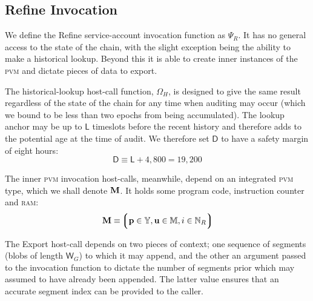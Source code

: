 \subsection{Refine Invocation}\label{sec:refineinvocation}

We define the Refine service-account invocation function as $\Psi_R$. It has no general access to the state of the \Jam chain, with the slight exception being the ability to make a historical lookup. Beyond this it is able to create inner instances of the \textsc{pvm} and dictate pieces of data to export.

The historical-lookup host-call function, $\Omega_H$, is designed to give the same result regardless of the state of the chain for any time when auditing may occur (which we bound to be less than two epochs from being accumulated). The lookup anchor may be up to $\mathsf{L}$ timeslots before the recent history and therefore adds to the potential age at the time of audit. We therefore set $\mathsf{D}$ to have a safety margin of eight hours:
\begin{equation}
  \mathsf{D} \equiv \mathsf{L} + 4,800 = 19,200
\end{equation}

The inner \textsc{pvm} invocation host-calls, meanwhile, depend on an integrated \textsc{pvm} type, which we shall denote $\mathbf{M}$. It holds some program code, instruction counter and \textsc{ram}:
\begin{equation}
  \pvm \equiv \tuple{\isa{\mathbf{p}}{\blob}, \isa{\mathbf{u}}{\ram}, \isa{i}{\N_R}}
\end{equation}

The Export host-call depends on two pieces of context; one sequence of segments (blobs of length $\mathsf{W}_G$) to which it may append, and the other an argument passed to the invocation function to dictate the number of segments prior which may assumed to have already been appended. The latter value ensures that an accurate segment index can be provided to the caller.


